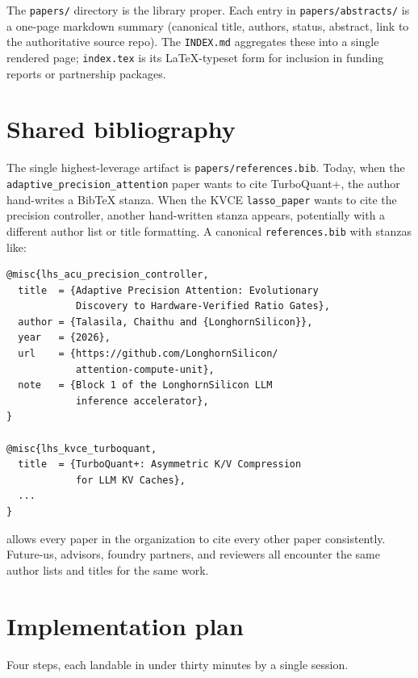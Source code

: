 \documentclass[11pt]{article}
\begin{document}
The \texttt{papers/} directory is the library proper. Each entry
in \texttt{papers/abstracts/} is a one-page markdown summary
(canonical title, authors, status, abstract, link to the
authoritative source repo). The \texttt{INDEX.md} aggregates these
into a single rendered page; \texttt{index.tex} is its LaTeX-typeset
form for inclusion in funding reports or partnership packages.

\section{Shared bibliography}

The single highest-leverage artifact is
\texttt{papers/references.bib}. Today, when the
\texttt{adaptive\_precision\_attention} paper wants to cite
TurboQuant+, the author hand-writes a BibTeX stanza. When the
KVCE \texttt{lasso\_paper} wants to cite the precision controller,
another hand-written stanza appears, potentially with a different
author list or title formatting. A canonical
\texttt{references.bib} with stanzas like:

\begin{lstlisting}[basicstyle=\ttfamily\small,frame=single]
@misc{lhs_acu_precision_controller,
  title  = {Adaptive Precision Attention: Evolutionary
            Discovery to Hardware-Verified Ratio Gates},
  author = {Talasila, Chaithu and {LonghornSilicon}},
  year   = {2026},
  url    = {https://github.com/LonghornSilicon/
            attention-compute-unit},
  note   = {Block 1 of the LonghornSilicon LLM
            inference accelerator},
}

@misc{lhs_kvce_turboquant,
  title  = {TurboQuant+: Asymmetric K/V Compression
            for LLM KV Caches},
  ...
}
\end{lstlisting}

allows every paper in the organization to cite every other paper
consistently. Future-us, advisors, foundry partners, and reviewers
all encounter the same author lists and titles for the same work.

\section{Implementation plan}

Four steps, each landable in under thirty minutes by a single
session.
\end{document}
